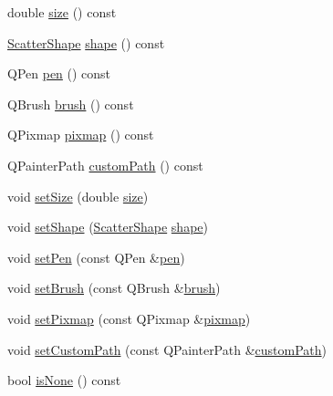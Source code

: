 \begin{DoxyCompactItemize}
\item 
double \hyperlink{class_q_c_p_scatter_style_a1973ee650368f1c5f55507b78473f634}{size} () const 
\item 
\hyperlink{class_q_c_p_scatter_style_adb31525af6b680e6f1b7472e43859349}{Scatter\+Shape} \hyperlink{class_q_c_p_scatter_style_a4462a25ef17769631f4e0aa81dadca4b}{shape} () const 
\item 
Q\+Pen \hyperlink{class_q_c_p_scatter_style_a3c24c3bf37b561b4807aed9f1418ab58}{pen} () const 
\item 
Q\+Brush \hyperlink{class_q_c_p_scatter_style_a46bf481d84bfa31b287dd43a3bf86d37}{brush} () const 
\item 
Q\+Pixmap \hyperlink{class_q_c_p_scatter_style_a9bab44cc41fcd585621a4b3e0e48231b}{pixmap} () const 
\item 
Q\+Painter\+Path \hyperlink{class_q_c_p_scatter_style_a4dd4998dfb0d6889205668a06c790328}{custom\+Path} () const 
\item 
void \hyperlink{class_q_c_p_scatter_style_aaefdd031052892c4136129db68596e0f}{set\+Size} (double \hyperlink{class_q_c_p_scatter_style_a1973ee650368f1c5f55507b78473f634}{size})
\item 
void \hyperlink{class_q_c_p_scatter_style_a7c641c4d4c6d29cb705d3887cfce91c1}{set\+Shape} (\hyperlink{class_q_c_p_scatter_style_adb31525af6b680e6f1b7472e43859349}{Scatter\+Shape} \hyperlink{class_q_c_p_scatter_style_a4462a25ef17769631f4e0aa81dadca4b}{shape})
\item 
void \hyperlink{class_q_c_p_scatter_style_a761f1f229cc0ca4703e1e2b89f6dd1ba}{set\+Pen} (const Q\+Pen \&\hyperlink{class_q_c_p_scatter_style_a3c24c3bf37b561b4807aed9f1418ab58}{pen})
\item 
void \hyperlink{class_q_c_p_scatter_style_a74d692aaeb8d4b36d6f7d510e44264b1}{set\+Brush} (const Q\+Brush \&\hyperlink{class_q_c_p_scatter_style_a46bf481d84bfa31b287dd43a3bf86d37}{brush})
\item 
void \hyperlink{class_q_c_p_scatter_style_a5fb611d46acfac520d7b89a1c71d9246}{set\+Pixmap} (const Q\+Pixmap \&\hyperlink{class_q_c_p_scatter_style_a9bab44cc41fcd585621a4b3e0e48231b}{pixmap})
\item 
void \hyperlink{class_q_c_p_scatter_style_a96a3e949f90b2afe5677ca9412a12a1e}{set\+Custom\+Path} (const Q\+Painter\+Path \&\hyperlink{class_q_c_p_scatter_style_a4dd4998dfb0d6889205668a06c790328}{custom\+Path})
\item 
bool \hyperlink{class_q_c_p_scatter_style_aa3861281108d0adbeb291c820ea3925c}{is\+None} () const 
\item 

\end{DoxyCompactItemize}
